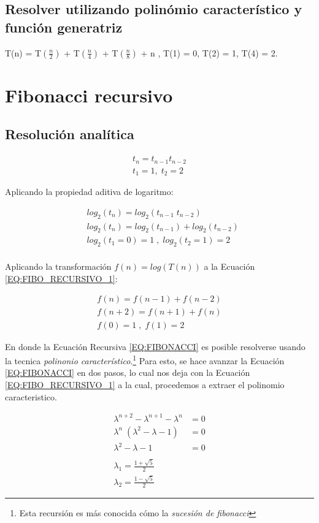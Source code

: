 \documentclass[11pt]{utalcaDoc}
\numberwithin{equation}{section}
\begin{document}
\subsection{Resolver utilizando polinómio característico y función generatriz}
	\begin{center}
		T(n) = T$\left(\frac{n}{2}\right)$ + T$\left(\frac{n}{4}\right)$ + T$\left(\frac{n}{8}\right)$ + n , T(1) = 0, T(2) = 1, T(4) = 2.
	\end{center}	\newpage
\section{Fibonacci recursivo}
\subsection{Resolución analítica}
\begin{align}
	t_n = t_{n-1}t_{n-2}\nonumber\\
	t_1 = 1 ,\; t_2=2 \nonumber 	
\end{align}

Aplicando la propiedad aditiva de logaritmo:

\begin{align}
	&log_2(t_n)=log_2(t_{n-1} \; t_{n-2}) \nonumber\\
	&log_2(t_n)=log_2(t_{n-1})+log_2(t_{n-2}) \label{EQ:FIBO_RECURSIVO_1}\\
	&log_2(t_1=0)=1 \;,\; log_2(t_2=1)=2 \nonumber\\
\end{align}

Aplicando la transformación $f(n) = log(T(n))$ a la Ecuación \ref{EQ:FIBO_RECURSIVO_1}:

\begin{align}
	f(n) = f(n-1) + f(n-2) \label{EQ:FIBONACCI} \\
	f(n+2) = f(n+1) + f(n) \label{EQ:FIBONACCI_DESPLAZADO}\\
	f(0) = 1 \;,\; f(1) = 2 \nonumber
\end{align}

En donde la Ecuación Recursiva \ref{EQ:FIBONACCI} es posible resolverse usando la tecnica \textit{polinonio característico}.\footnote{Esta recursión es más conocida cómo la \textit{sucesión de fibonacci}} Para esto, se hace avanzar la Ecuación \ref{EQ:FIBONACCI} en dos pasos, lo cual nos deja con la Ecuación \ref{EQ:FIBO_RECURSIVO_1} a la cual, procedemos a extraer el polinomio caracteristico.

\begin{align}
	\lambda^{n+2} - \lambda^{n+1} - \lambda^{n} &= 0 \nonumber\\
	\lambda^{n}\;(\lambda^{2} - \lambda - 1) &= 0 \label{EQ:POLINOMIO_FIBONACCI_1}\\	
	\lambda^{2} - \lambda - 1 &= 0 \label{EQ:POLINOMIO_FIBONACCI_SIMP}\\
	\nonumber\\
	\lambda_1 = \frac{1+\sqrt{5}}{2} \nonumber\\
	\lambda_2 = \frac{1-\sqrt{5}}{2} \nonumber
\end{align}
\end{document}
